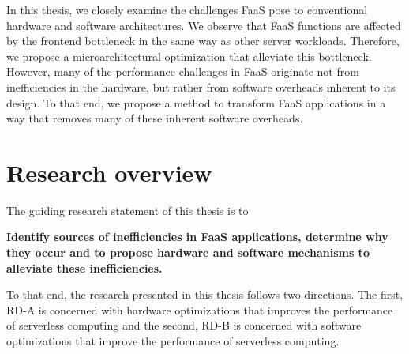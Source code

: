 \documentclass[../main.tex]{subfiles}
\begin{document}
\begin{refsection}
In this thesis, we closely examine the challenges FaaS pose to
conventional hardware and software architectures. We observe that FaaS
functions are affected by the frontend bottleneck in the same way as
other server workloads. Therefore, we propose a microarchitectural
optimization that alleviate this bottleneck. However, many of the
performance challenges in FaaS originate not from inefficiencies in
the hardware, but rather from software overheads inherent to its
design. To that end, we propose a method to transform FaaS
applications in a way that removes many of these inherent software overheads.




\section{Research overview}
The guiding research statement of this thesis is to 
\begin{framed}
\noindent
\textbf{Identify sources of inefficiencies in FaaS applications, determine why they occur and to propose hardware and software mechanisms to alleviate these inefficiencies.}
\end{framed}
\noindent
To that end, the research presented in this thesis follows two
directions. The first, RD-A is concerned with hardware optimizations
that improves the performance of serverless computing and the second,
RD-B is concerned with software optimizations that improve the
performance of serverless computing.



\end{refsection}
\end{document}
